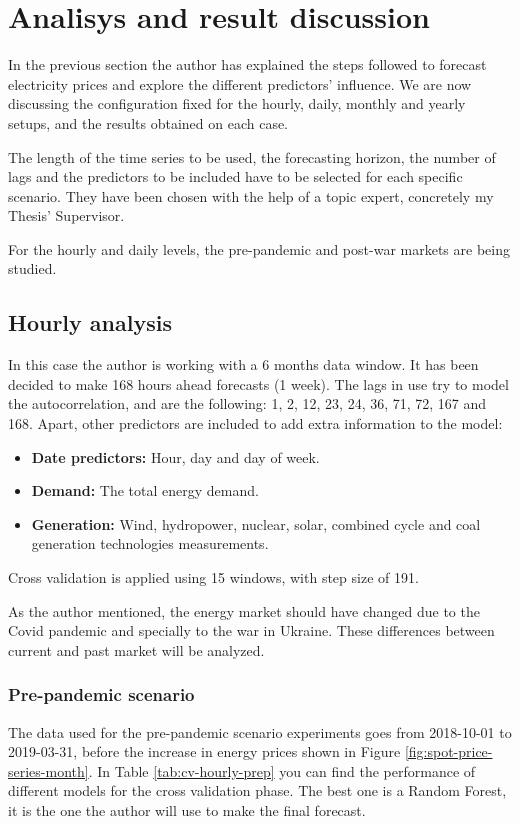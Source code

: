 \chapter{Analisys and result discussion}
In the previous section the author has explained the steps followed to forecast electricity prices and explore the different predictors' influence. We are now discussing the configuration fixed for the hourly, daily, monthly and yearly setups, and the results obtained on each case.

The length of the time series to be used, the forecasting horizon, the number of lags and the predictors to be included have to be selected for each specific scenario. They have been chosen with the help of a topic expert, concretely my Thesis' Supervisor.

For the hourly and daily levels, the pre-pandemic and post-war markets are being studied.

\section{Hourly analysis}
In this case the author is working with a 6 months data window. It has been decided to make 168 hours ahead forecasts (1 week). The lags in use try to model the autocorrelation, and are the following: 1, 2, 12, 23, 24, 36, 71, 72, 167 and 168. Apart, other predictors are included to add extra information to the model:

\begin{itemize}
    \item \textbf{Date predictors:} Hour, day and day of week.
    \item \textbf{Demand:} The total energy demand.
    \item \textbf{Generation:} Wind, hydropower, nuclear, solar, combined cycle and coal generation technologies measurements.
\end{itemize}

Cross validation is applied using 15 windows, with step size of 191.

As the author mentioned, the energy market should have changed due to the Covid pandemic and specially to the war in Ukraine. These differences between current and past market will be analyzed.

\subsection{Pre-pandemic scenario}
The data used for the pre-pandemic scenario experiments goes from 2018-10-01 to 2019-03-31, before the increase in energy prices shown in Figure \ref{fig:spot-price-series-month}. In Table \ref{tab:cv-hourly-prep} you can find the performance of different models for the cross validation phase. The best one is a Random Forest, it is the one the author will use to make the final forecast.


